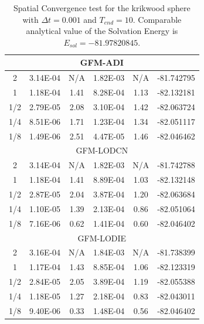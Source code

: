 \begin{table}[!ht]
\begin{tabular}{c c c c c c }
\multicolumn{6}{c}{GFM-ADI} \\ \hline
  2 & 3.14E-04 & N/A & 1.82E-03 & N/A & -81.742795 \\ %
  1 & 1.18E-04 & 1.41 & 8.28E-04 & 1.13 & -82.132181 \\%
1/2 & 2.79E-05 & 2.08 & 3.10E-04 & 1.42 & -82.063724 \\ %
1/4 & 8.51E-06 & 1.71 & 1.23E-04 & 1.34 & -82.051117 \\ %
1/8 & 1.49E-06 & 2.51 & 4.47E-05 & 1.46 & -82.046462 \\ \hline
\multicolumn{6}{c}{GFM-LODCN} \\ \hline
  2 & 3.14E-04 & N/A  & 1.82E-03 & N/A  & -81.742788 \\ %
  1 & 1.18E-04 & 1.41 & 8.89E-04 & 1.03 & -82.132148 \\ %
1/2 & 2.87E-05 & 2.04 & 3.87E-04 & 1.20 & -82.063684 \\ %
1/4 & 1.10E-05 & 1.39 & 2.13E-04 & 0.86 & -82.051064 \\ %
1/8 & 7.16E-06 & 0.62 & 1.41E-04 & 0.60 & -82.046402 \\ \hline
\multicolumn{6}{c}{GFM-LODIE} \\ \hline
2   & 3.16E-04 & N/A   & 1.84E-03 & N/A   & -81.738399 \\ %
1   & 1.17E-04 & 1.43  & 8.85E-04 & 1.06  & -82.123319 \\ %
1/2 & 2.84E-05 & 2.05  & 3.89E-04 & 1.19  & -82.055388 \\ %
1/4 & 1.18E-05 & 1.27  & 2.18E-04 & 0.83  & -82.043011 \\ %
1/8 & 9.40E-06 & 0.33  & 1.48E-04 & 0.56  & -82.046402 \\ \hline
\end{tabular}
\caption{Spatial Convergence test for the krikwood sphere with $\Delta t = 0.001$ and $T_{end}=10$. Comparable analytical value of the Solvation Energy is $E_{sol} = -81.97820845$.}
\label{tab:krikwood}
\end{table}


